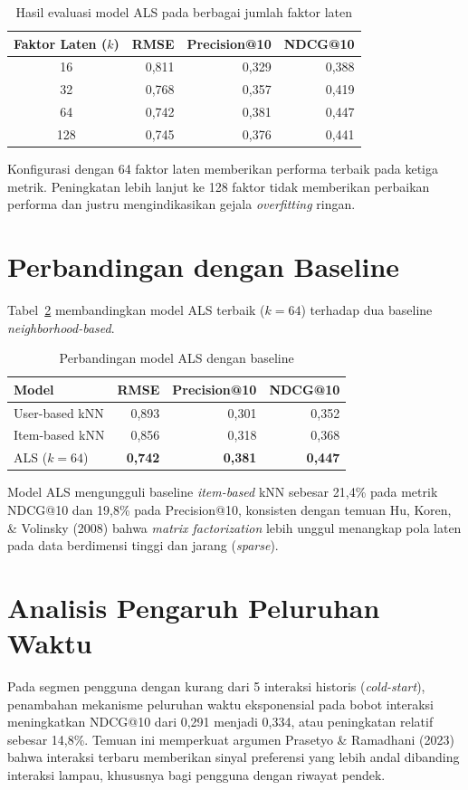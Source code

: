 \documentclass[12pt,a4paper]{report}
\begin{document}
\begin{onehalfspace}
\begin{table}[htb]
\centering
\caption{Hasil evaluasi model ALS pada berbagai jumlah faktor laten}
\label{tab:hasil}
\begin{tabular}{@{}crrr@{}}
\toprule
\textbf{Faktor Laten ($k$)} & \textbf{RMSE} & \textbf{Precision@10} & \textbf{NDCG@10} \\
\midrule
16  & 0,811 & 0,329 & 0,388 \\
32  & 0,768 & 0,357 & 0,419 \\
64  & 0,742 & 0,381 & 0,447 \\
128 & 0,745 & 0,376 & 0,441 \\
\bottomrule
\end{tabular}
\end{table}

Konfigurasi dengan 64 faktor laten memberikan performa terbaik pada ketiga
metrik. Peningkatan lebih lanjut ke 128 faktor tidak memberikan perbaikan
performa dan justru mengindikasikan gejala \emph{overfitting} ringan.

\section{Perbandingan dengan Baseline}
Tabel~\ref{tab:baseline} membandingkan model ALS terbaik ($k=64$) terhadap
dua baseline \emph{neighborhood-based}.

\begin{table}[htb]
\centering
\caption{Perbandingan model ALS dengan baseline}
\label{tab:baseline}
\begin{tabular}{@{}lrrr@{}}
\toprule
\textbf{Model} & \textbf{RMSE} & \textbf{Precision@10} & \textbf{NDCG@10} \\
\midrule
User-based kNN & 0,893 & 0,301 & 0,352 \\
Item-based kNN & 0,856 & 0,318 & 0,368 \\
ALS ($k=64$) & \textbf{0,742} & \textbf{0,381} & \textbf{0,447} \\
\bottomrule
\end{tabular}
\end{table}

Model ALS mengungguli baseline \emph{item-based} kNN sebesar 21,4\% pada
metrik NDCG@10 dan 19,8\% pada Precision@10, konsisten dengan temuan Hu,
Koren, \& Volinsky (2008) bahwa \emph{matrix factorization} lebih unggul
menangkap pola laten pada data berdimensi tinggi dan jarang (\emph{sparse}).

\section{Analisis Pengaruh Peluruhan Waktu}
Pada segmen pengguna dengan kurang dari 5 interaksi historis
(\emph{cold-start}), penambahan mekanisme peluruhan waktu eksponensial pada
bobot interaksi meningkatkan NDCG@10 dari 0,291 menjadi 0,334, atau
peningkatan relatif sebesar 14,8\%. Temuan ini memperkuat argumen Prasetyo
\& Ramadhani (2023) bahwa interaksi terbaru memberikan sinyal preferensi
yang lebih andal dibanding interaksi lampau, khususnya bagi pengguna dengan
riwayat pendek.


\end{onehalfspace}
\end{document}
